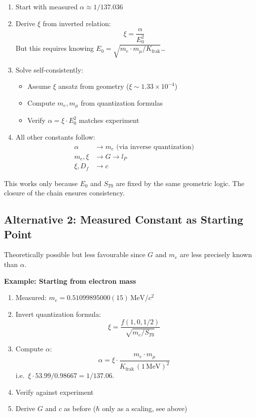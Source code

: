 	\begin{enumerate}
		\item Start with measured $\alpha \approx 1/137.036$
		
		\item Derive $\xi$ from inverted relation:
		\[
		\xi = \frac{\alpha}{E_0^2}
		\]
		But this requires knowing $E_0 = \sqrt{m_e \cdot m_\mu/K_{\text{frak}}}$\ldots
		
		\item Solve self-consistently:
		\begin{itemize}
			\item Assume $\xi$ ansatz from geometry ($\xi \sim 1.33 \times 10^{-4}$)
			\item Compute $m_e, m_\mu$ from quantization formulas
			\item Verify $\alpha = \xi \cdot E_0^2$ matches experiment
		\end{itemize}
		
		\item All other constants follow:
		\begin{align}
			\alpha &\to m_e \text{ (via inverse quantization)} \\
			m_e, \xi &\to G \to l_P \\
			\xi, D_f &\to c
		\end{align}
	\end{enumerate}
	
	This works only because $E_0$ and $S_{T0}$ are fixed by the same geometric logic. The closure of the chain ensures consistency.
	
	\subsection{Alternative 2: Measured Constant as Starting Point}
	
	Theoretically possible but less favourable since $G$ and $m_e$ are less precisely known than $\alpha$.
	
	\textbf{Example: Starting from electron mass}
	
	\begin{enumerate}
		\item Measured: $m_e = 0.51099895000(15)\,\text{MeV}/c^2$
		
		\item Invert quantization formula:
		\[
		\xi = \frac{f(1,0,1/2)}{\sqrt{m_e / S_{T0}}}
		\]
		
		\item Compute $\alpha$:
		\[
		\alpha = \xi \cdot \frac{m_e \cdot m_\mu}{K_{\text{frak}}\,(1\,\text{MeV})^2}
		\]
		i.e.\ $\xi \cdot 53.99/0.98667 = 1/137.06$.
		
		\item Verify against experiment
		
		\item Derive $G$ and $c$ as before ($\hbar$ only as a scaling, see above)
	\end{enumerate}
	
